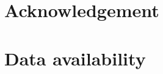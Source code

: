 \documentclass[3p, authoryear]{elsarticle}
\begin{document}
\section*{Acknowledgement}

\section*{Data availability}



\end{document}

